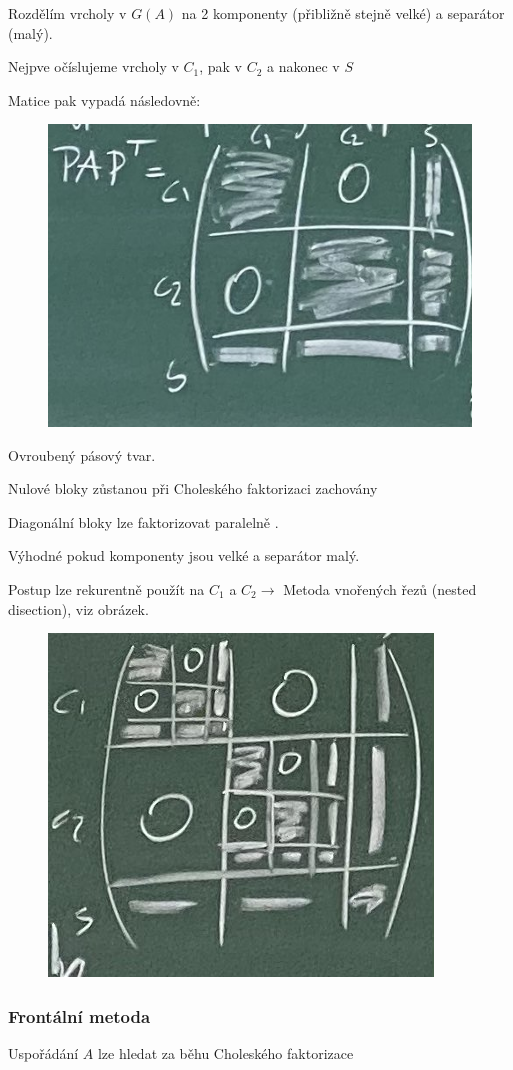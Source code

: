\documentclass[../main.tex]{subfiles}
\begin{document}
Rozdělím vrcholy v $G(A)$ na 2 komponenty (přibližně stejně velké) a separátor (malý).

Nejpve očíslujeme vrcholy  v $C_1$, pak v $C_2$ a nakonec v $S$

Matice pak vypadá následovně:

\begin{figure}[H]
    \centering
    \includegraphics[width=0.5\linewidth]{images/2-11architekt.jpg}
\end{figure}

Ovroubený pásový tvar. 

Nulové bloky zůstanou při Choleského faktorizaci zachovány 


Diagonální bloky lze faktorizovat paralelně .

Výhodné pokud komponenty jsou velké a separátor malý.

Postup lze  rekurentně použít na $C_1$ a $C_2\rightarrow$ Metoda vnořených řezů (nested disection), viz obrázek.
\begin{figure}[H]
    \centering
    \includegraphics[width=0.5\linewidth]{images/2-11-nesteddissection.jpg}
\end{figure}

\subsubsection{Frontální metoda}

Uspořádání $A$ lze hledat za běhu Choleského faktorizace 
\end{document}
